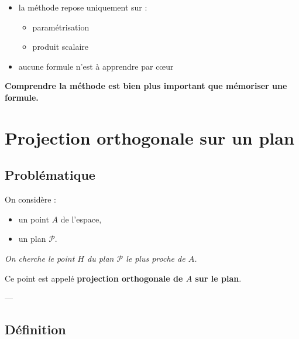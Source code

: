 \documentclass[11pt,a4paper]{article}
\begin{document}
\begin{itemize}
\item la méthode repose uniquement sur :
\begin{itemize}
\item paramétrisation
\item produit scalaire
\end{itemize}

\item aucune formule n’est à apprendre par cœur
\end{itemize}

\bigskip

\begin{center}
\textbf{Comprendre la méthode est bien plus important que mémoriser une formule.}
\end{center}

\section{Projection orthogonale sur un plan}

\subsection{Problématique}

On considère :

\begin{itemize}
\item un point $A$ de l’espace,
\item un plan $\mathcal{P}$.
\end{itemize}

\bigskip

\begin{center}
\textit{On cherche le point $H$ du plan $\mathcal{P}$ le plus proche de $A$.}
\end{center}

\bigskip

Ce point est appelé \textbf{projection orthogonale de $A$ sur le plan}.

---

\subsection{Définition}
\end{document}
